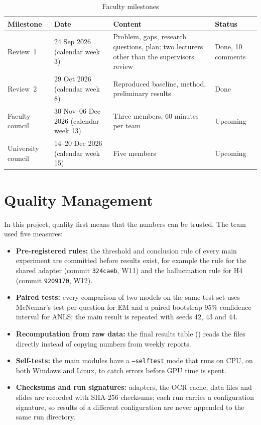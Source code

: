\begin{table}[htbp]
\caption{Faculty milestones}
\label{tab:pm-milestones}
\centering
\small
\begin{tabular}{p{}p{}p{}p{}}
\toprule
\textbf{Milestone} & \textbf{Date} & \textbf{Content} & \textbf{Status} \\
\midrule
Review~1 & 24 Sep 2026 (calendar week 3) & Problem, gaps, research questions, plan; two lecturers other than the supervisors review & Done, 10 comments \\
Review~2 & 29 Oct 2026 (calendar week 8) & Reproduced baseline, method, preliminary results & Done \\
Faculty council & 30 Nov--06 Dec 2026 (calendar week 13) & Three members, 60 minutes per team & Upcoming \\
University council & 14--20 Dec 2026 (calendar week 15) & Five members & Upcoming \\
\bottomrule
\end{tabular}
\end{table}

\section{Quality Management}

In this project, quality first means that the numbers can be trusted. The team
used five measures:

\begin{itemize}
  \item \textbf{Pre-registered rules:} the threshold and conclusion rule of every
  main experiment are committed before results exist, for example the rule for
  the shared adapter (commit \texttt{324caeb}, W11) and the hallucination rule
  for H4 (commit \texttt{9209170}, W12).
  \item \textbf{Paired tests:} every comparison of two models on the same test
  set uses McNemar's test per question for EM and a paired bootstrap 95\%
  confidence interval for ANLS; the main result is repeated with seeds 42, 43
  and 44.
  \item \textbf{Recomputation from raw data:} the final results table
  () reads the 
  files directly instead of copying numbers from weekly reports.
  \item \textbf{Self-tests:} the main modules have a \texttt{--selftest} mode that
  runs on CPU, on both Windows and Linux, to catch errors before GPU time is
  spent.
  \item \textbf{Checksums and run signatures:} adapters, the OCR cache, data files
  and slides are recorded with SHA-256 checksums; each run carries a
  configuration signature, so results of a different configuration are never
  appended to the same run directory.
\end{itemize}

